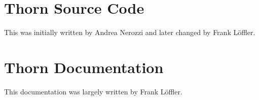 \documentclass{article}
\begin{document}
\section{Thorn Source Code}

This was initially written by Andrea Nerozzi and later changed
by Frank L\"offler.

\section{Thorn Documentation}

This documentation was largely written by Frank L\"offler.

\end{document}
